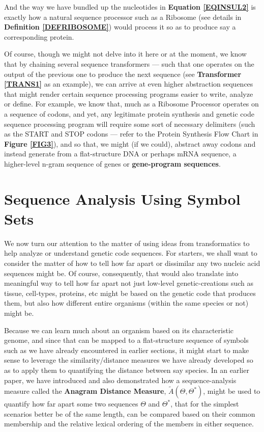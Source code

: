 \documentclass[a4paper, 18pt]{book} %
\begin{document}
And the way we have bundled up the nucleotides in \textbf{Equation \ref{EQINSUL2}} is exactly how a natural sequence processor such as a Ribosome (see details in \textbf{Definition \ref{DEFRIBOSOME}}) would process it so as to produce say a corresponding protein.

Of course, though we might not delve into it here or at the moment, we know that by chaining several sequence transformers --- such that one operates on the output of the previous one to produce the next sequence (see \textbf{Transformer \ref{TRANS1}} as an example), we can arrive at even higher abstraction sequences that might render certain sequence processing programs easier to write, analyze or define. For example, we know that, much as a Ribosome Processor operates on a sequence of codons, and yet, any legitimate protein synthesis and genetic code sequence processing program will require some sort of necessary delimiters (such as the START and STOP codons --- refer to the Protein Synthesis Flow Chart in \textbf{Figure \ref{FIG3}}), and so that, we might (if we could), abstract away codons and instead generate from a flat-structure DNA or perhaps mRNA sequence, a higher-level n-gram sequence of genes or \textbf{gene-program sequences}.


\chapter{Sequence Analysis Using Symbol Sets}
\label{SEC3}

We now turn our attention to the matter of using ideas from transformatics to help analyze or understand genetic code sequences. For starters, we shall want to consider the matter of how to tell how far apart or dissimilar any two nucleic acid sequences might be. Of course, consequently, that would also translate into meaningful way to tell how far apart not just low-level genetic-creations such as tissue, cell-types, proteins, etc might be based on the genetic code that produces them, but also how different entire organisms (within the same species or not) might be.

Because we can learn much about an organism based on its characteristic genome, and since that can be mapped to a flat-structure sequence of symbols such as we have already encountered in earlier sections, it might start to make sense to leverage the similarity/distance measures we have already developed so as to apply them to quantifying the distance between say species. In an earlier paper\cite{adtpaper}, we have introduced and also demonstrated how a sequence-analysis measure called the \textbf{Anagram Distance Measure}, $\tilde{A}(\Theta,\Theta^*)$, might be used to quantify how far apart some two sequences $\Theta$ and $\Theta^*$, that for the simplest scenarios better be of the same length, can be compared based on their common membership and the relative lexical ordering of the members in either sequence.
\end{document}
